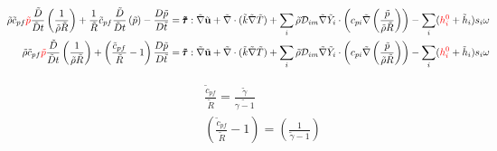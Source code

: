 \documentclass[preprint,12pt,authoryear]{elsarticle}
\begin{document}
\begin{equation}
\begin{split}
\hspace{-1cm}
        \tilde{\rho}
        \tilde{c}_{pf}
        {\color{red} \tilde{p} }
        \frac{\tilde{D}}{\tilde{D} t}
        \left(
                \frac{1}{\tilde{\rho}\tilde{R}}
        \right)
	+
        \frac{1}{\tilde{R}}
        \tilde{c}_{pf}
        \frac{\tilde{D}}{\tilde{D} t}
        \left(
                \tilde{p}
        \right)
        -
        \frac{D \tilde{p}}{D\tilde{t}}
        =
        \pmb{\tilde{\tau}}:\tilde{\nabla} \tilde{\mathbf{u}} 
        + 
        \tilde{\nabla} \cdot (\tilde{k}\tilde{\nabla} \tilde{T})
        +
        \sum\limits_i 
        \tilde{\rho}
        \mathcal{D}_{im}
        \tilde{\nabla}
        \tilde{Y}_i     
        \cdot
        \left(
                c_{pi}
                \tilde{\nabla}
                \left(
                	\frac{\tilde{p}}{\tilde{\rho}\tilde{R}}
                \right)
        \right)
	-
        \sum\limits_i
        ({\color{red} h_i^0} + \tilde{h}_i)
        s_i	
        \omega
\\
\hspace{-1cm}
        \tilde{\rho}
        \tilde{c}_{pf}
        {\color{red} \tilde{p} }
        \frac{\tilde{D}}{\tilde{D} t}
        \left(
                \frac{1}{\tilde{\rho}\tilde{R}}
        \right)
	+
        \left(
        	\frac{\tilde{c}_{pf}}{\tilde{R}}
		-1
        \right)
        \frac{D \tilde{p}}{D\tilde{t}}
        =
        \pmb{\tilde{\tau}}:\tilde{\nabla} \tilde{\mathbf{u}} 
        + 
        \tilde{\nabla} \cdot (\tilde{k}\tilde{\nabla} \tilde{T})
        +
        \sum\limits_i 
        \tilde{\rho}
        \mathcal{D}_{im}
        \tilde{\nabla}
        \tilde{Y}_i     
        \cdot
        \left(
                c_{pi}
                \tilde{\nabla}
                \left(
                	\frac{\tilde{p}}{\tilde{\rho}\tilde{R}}
                \right)
        \right)
	-
        \sum\limits_i
        ({\color{red} h_i^0} + \tilde{h}_i)
        s_i	
        \omega
\end{split}
\end{equation}

\begin{equation}
\begin{split}
	\frac{\tilde{c}_{pf}}{\tilde{R}}=\frac{\tilde{\gamma}}{\tilde{\gamma-1}}
	\\
        \left(
        	\frac{\tilde{c}_{pf}}{\tilde{R}}
		-1
        \right)
	=
        \left(
		\frac{1}{\tilde{\gamma}-1}
        \right)
\end{split}
\end{equation}
\end{document}
